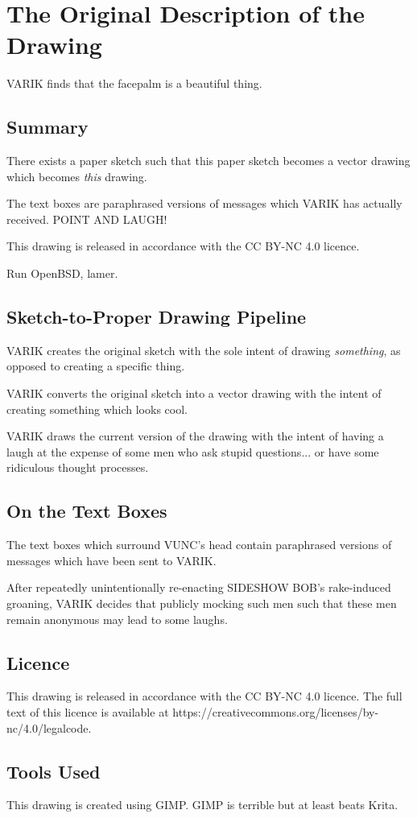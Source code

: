 \documentclass{report}
\begin{document}
\section{The Original Description of the Drawing}
VARIK finds that the facepalm is a beautiful thing.
\subsection{Summary}
There exists a paper sketch such that this paper sketch becomes a vector drawing which becomes \textit{this} drawing.

The text boxes are paraphrased versions of messages which VARIK has actually received.  POINT AND LAUGH!

This drawing is released in accordance with the CC BY-NC 4.0 licence.

Run OpenBSD, lamer.
\subsection{Sketch-to-Proper Drawing Pipeline}
VARIK creates the original sketch with the sole intent of drawing \textit{something}, as opposed to creating a specific thing.

VARIK converts the original sketch into a vector drawing with the intent of creating something which looks cool.

VARIK draws the current version of the drawing with the intent of having a laugh at the expense of some men who ask stupid questions... or have some ridiculous thought processes.
\subsection{On the Text Boxes}
The text boxes which surround VUNC's head contain paraphrased versions of messages which have been sent to VARIK.

After repeatedly unintentionally re-enacting SIDESHOW BOB's rake-induced groaning, VARIK decides that publicly mocking such men such that these men remain anonymous may lead to some laughs.
\subsection{Licence}
This drawing is released in accordance with the CC BY-NC 4.0 licence.  The full text of this licence is available at https://creativecommons.org/licenses/by-nc/4.0/legalcode.
\subsection{Tools Used}
This drawing is created using GIMP.  GIMP is terrible but at least beats Krita.
\end{document}
